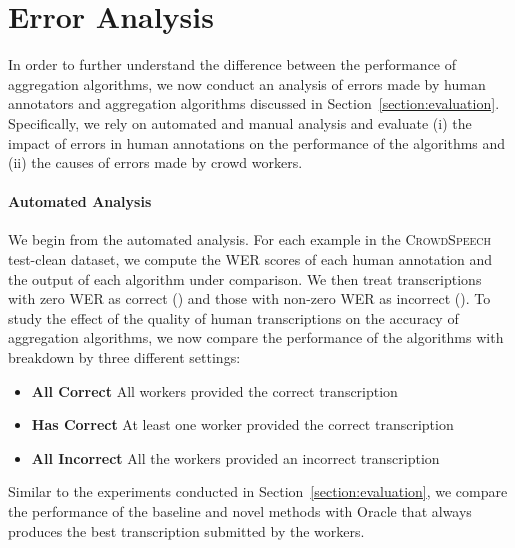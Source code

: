 \documentclass{article}
\newcommand{\speech}{\textsc{CrowdSpeech}}
\begin{document}
\section{Error Analysis}
\label{section:error}

In order to further understand the difference between the performance of aggregation algorithms, we now conduct an analysis of errors made by human annotators and aggregation algorithms discussed in Section~\ref{section:evaluation}. Specifically, we rely on automated and manual analysis and evaluate (i) the impact of errors in human annotations on the performance of the algorithms and (ii) the causes of errors made by crowd workers. 


\paragraph{Automated Analysis} We begin from the automated analysis. For each example in the \speech{} test-clean dataset, we compute the WER scores of each human annotation and the output of each algorithm under comparison. We then treat transcriptions with zero WER as correct () and those with non-zero WER as incorrect (). To study the effect of the quality of human transcriptions on the accuracy of aggregation algorithms, we now compare the performance of the algorithms with breakdown by three different settings: 
\begin{itemize}[itemsep=0pt, leftmargin=15pt, topsep=0pt]
    \item \textbf{All Correct} All workers provided the correct transcription
    
    \item \textbf{Has Correct} At least one worker provided the correct transcription
    
    \item \textbf{All Incorrect} All the workers provided an incorrect transcription
\end{itemize}

Similar to the experiments conducted in Section~\ref{section:evaluation}, we compare the performance of the baseline and novel methods with Oracle that always produces the best transcription submitted by the workers.
\end{document}

